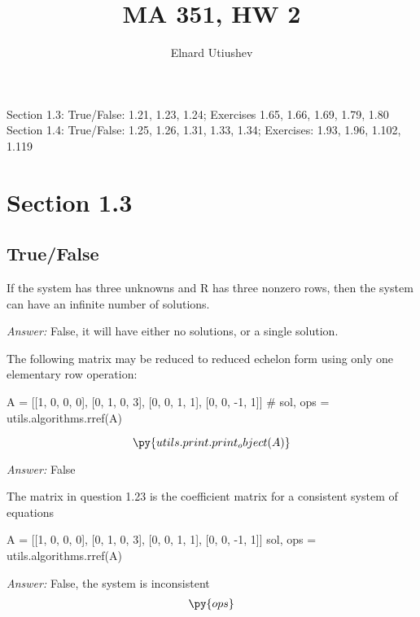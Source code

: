 \documentclass[letterpaper]{article}
\title{MA 351, HW 2}
\author{Elnard Utiushev}
\newcommand{\ans}{\textit{Answer: }}
\newenvironment{question}[2][Question]{\begin{trivlist}
\item[\hskip \labelsep {\bfseries #1}\hskip \labelsep {\bfseries #2.}]}{\end{trivlist}}
\newcommand{\printobj}[1]{\py{utils.print.print_object(#1)}}
\begin{document}
\maketitle

Section 1.3: True/False: 1.21, 1.23, 1.24; Exercises 1.65, 1.66, 1.69, 1.79, 1.80 \\
Section 1.4: True/False: 1.25, 1.26, 1.31, 1.33, 1.34; Exercises: 1.93, 1.96, 1.102, 1.119

\section{Section 1.3}
\subsection{True/False}

\begin{question}{1.21}
    If the system has three unknowns and R has three nonzero rows, then the
    system can have an infinite number of solutions.

    \ans False, it will have either no solutions, or a single solution.
\end{question}

\begin{question}{1.23}
    The following matrix may be reduced to reduced echelon form using only one
    elementary row operation:

    \begin{pycode}
A = [[1, 0, 0, 0], [0, 1, 0, 3], [0, 0, 1, 1], [0, 0, -1, 1]]
# sol, ops = utils.algorithms.rref(A)
    \end{pycode}

    $$\printobj{A}$$

    \ans False
\end{question}

\begin{question}{1.24}
    The matrix in question 1.23 is the coefficient matrix for a consistent
    system of equations

    \begin{pycode}
A = [[1, 0, 0, 0], [0, 1, 0, 3], [0, 0, 1, 1], [0, 0, -1, 1]]
sol, ops = utils.algorithms.rref(A)
    \end{pycode}

    \ans False, the system is inconsistent
    \begin{align*}
        \py{ops}
    \end{align*}
    
\end{question}
\end{document}

